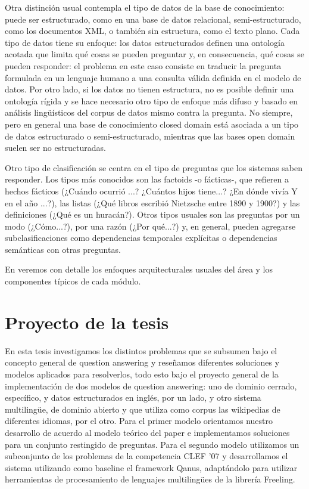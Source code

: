 Otra distinción usual contempla el tipo de datos de la base de conocimiento:  puede ser estructurado, como en una base de datos
relacional, semi-estructurado, como los documentos XML, o también sin estructura, como el texto plano. Cada tipo de datos tiene su enfoque:
los datos estructurados definen una ontología acotada que limita qué cosas se pueden preguntar y, en consecuencia, qué cosas se pueden responder: el problema en este caso consiste en traducir la pregunta formulada en un lenguaje humano a una consulta válida definida en el modelo de datos. Por otro lado, si los datos no tienen estructura, no es posible definir una ontología rígida y se hace necesario otro tipo de enfoque más difuso y basado en análisis lingüísticos del corpus de datos mismo contra la pregunta. No siempre,  pero en general una base de conocimiento closed domain está asociada a un tipo de datos estructurado o semi-estructurado, mientras que las bases open domain suelen ser no estructuradas.

Otro tipo de clasificación se centra en el tipo de preguntas que los sistemas saben responder. Los tipos más conocidos son las factoids -o fácticas-, que refieren a hechos fácticos (¿Cuándo ocurrió ...? ¿Cuántos hijos tiene...? ¿En dónde vivía Y en el año ...?), las listas (¿Qué libros escribió Nietzsche entre 1890 y 1900?) y las definiciones (¿Qué es un huracán?). Otros tipos usuales son las preguntas por un modo (¿Cómo...?), por una razón (¿Por qué...?) y, en general, pueden agregarse subclasificaciones como dependencias temporales explícitas o dependencias semánticas con otras preguntas.

En  veremos con detalle los enfoques arquitecturales usuales del área y los componentes típicos de cada módulo.

\section{Proyecto de la tesis}
\label{sec:proyecto}

En esta tesis investigamos los distintos problemas que se subsumen bajo el concepto general de question answering y reseñamos diferentes soluciones y modelos aplicados para resolverlos, todo esto bajo el proyecto general de la implementación de dos modelos de question answering: uno de dominio cerrado, específico, y datos estructurados en inglés, por un lado, y otro sistema multilingüe, de dominio abierto y que utiliza como corpus las wikipedias de diferentes idiomas, por el otro. Para el primer modelo orientamos nuestro desarrollo de acuerdo al modelo teórico del paper \cite{QADB1} e implementamos soluciones para un conjunto restingido de preguntas. Para el segundo modelo utilizamos   un subconjunto de los problemas de la competencia CLEF '07 y desarrollamos el sistema utilizando como baseline el framework Qanus, adaptándolo para utilizar herramientas de procesamiento de lenguajes multilingües de la librería Freeling.

